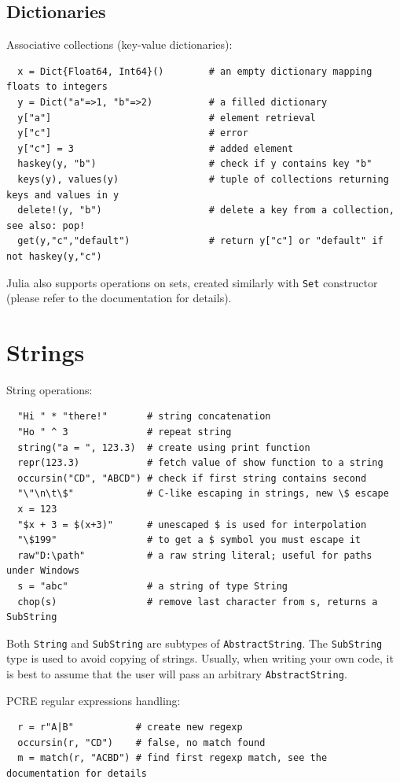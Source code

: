 \documentclass[10pt,a4paper]{article}
\begin{document}
\subsection{Dictionaries}
Associative collections (key-value dictionaries):
\begin{lstlisting}
  x = Dict{Float64, Int64}()        # an empty dictionary mapping floats to integers
  y = Dict("a"=>1, "b"=>2)          # a filled dictionary
  y["a"]                            # element retrieval
  y["c"]                            # error
  y["c"] = 3                        # added element
  haskey(y, "b")                    # check if y contains key "b"
  keys(y), values(y)                # tuple of collections returning keys and values in y
  delete!(y, "b")                   # delete a key from a collection, see also: pop!
  get(y,"c","default")              # return y["c"] or "default" if not haskey(y,"c")
\end{lstlisting}
Julia also supports operations on sets, created similarly with \lstinline|Set| constructor (please refer to the documentation for details).

\section{Strings}
String operations:
\begin{lstlisting}
  "Hi " * "there!"       # string concatenation
  "Ho " ^ 3              # repeat string
  string("a = ", 123.3)  # create using print function
  repr(123.3)            # fetch value of show function to a string
  occursin("CD", "ABCD") # check if first string contains second
  "\"\n\t\$"             # C-like escaping in strings, new \$ escape
  x = 123
  "$x + 3 = $(x+3)"      # unescaped $ is used for interpolation
  "\$199"                # to get a $ symbol you must escape it
  raw"D:\path"           # a raw string literal; useful for paths under Windows
  s = "abc"              # a string of type String
  chop(s)                # remove last character from s, returns a SubString
\end{lstlisting}

Both \lstinline|String| and \lstinline|SubString| are subtypes of \lstinline|AbstractString|.
The  \lstinline|SubString| type is used to avoid copying of strings. Usually, when writing your own code,
it is best to assume that the user will pass an arbitrary \lstinline|AbstractString|.

PCRE regular expressions handling:
\begin{lstlisting}
  r = r"A|B"           # create new regexp
  occursin(r, "CD")    # false, no match found
  m = match(r, "ACBD") # find first regexp match, see the documentation for details
\end{lstlisting}
\end{document}
